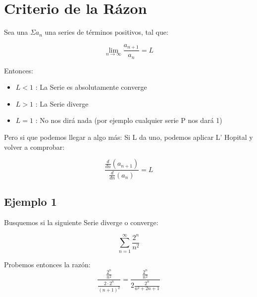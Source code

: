 \documentclass[12pt]{report}                                %
\begin{document}
    \section{Criterio de la Rázon}

        Sea una $\Sigma a_n$ una series de términos positivos, tal que:

        \begin{equation}
            \lim_{n \to \infty} \frac{a_{n+1}}{a_n} = L
        \end{equation}

        Entonces:
        \begin{itemize}
            \item $L < 1$ : La Serie es absolutamente converge
            \item $L > 1$ : La Serie diverge
            \item $L = 1$ : No nos dirá nada (por ejemplo cualquier serie P nos dará 1)
        \end{itemize}

        Pero si que podemos llegar a algo más:
        Si L da uno, podemos aplicar L' Hopital y volver a comprobar:

        \begin{equation}
        \frac{\frac{d}{dn} (a_{n+1})}{\frac{d}{dn} (a_n)} = L
        \end{equation}



        \subsection{Ejemplo 1}
        Busquemos si la siguiente Serie diverge o converge:

        \begin{equation*}
            \sum_{n=1}^{\infty} \frac{2^n}{n^2}
        \end{equation*}

        Probemos entonces la razón:
        \begin{equation*}
            \frac{ \frac{2^n}{n^2} }{ \frac{2 \cdot 2^n}{(n+1)^2 } } = \frac{ \frac{2^n}{n^2} }{ 2 \frac{2^n}{n^2 + 2n + 1} }
        \end{equation*}



    \clearpage
\end{document}
